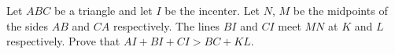 Let $ABC$ be a triangle and let $I$ be the incenter.
Let $N$, $M$ be the midpoints of the sides $AB$ and $CA$ respectively.
The lines $BI$ and $CI$ meet $MN$ at $K$ and $L$ respectively.
Prove that $AI+BI+CI > BC+KL$.
